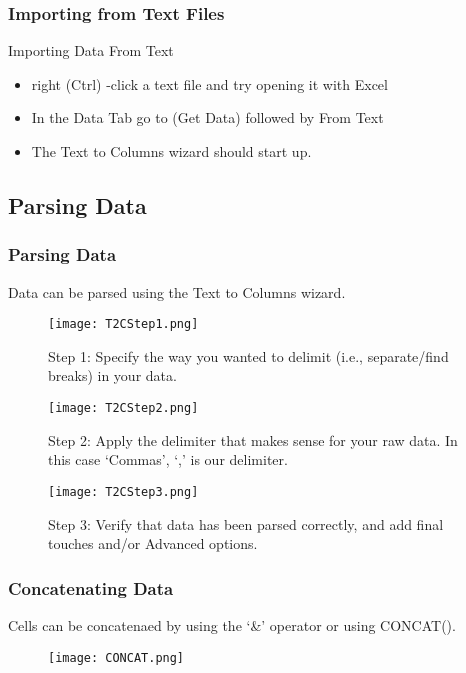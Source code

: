 \documentclass[12pt]{beamer}
\begin{document}
	\begin{frame}
		\frametitle{Importing from Text Files}
				Importing Data From Text
		\begin{itemize}
			\item right (Ctrl) -click a text file and try opening it with Excel
			\item In the Data Tab go to (Get Data) followed by From Text
			\item The Text to Columns wizard should start up. 
		\end{itemize}
	\end{frame}

\subsection{Parsing Data}
	\begin{frame}
		\frametitle{Parsing Data}
		Data can be parsed using the Text to Columns wizard. 
		\begin{figure}[ht]
			\begin{minipage}{0.3\linewidth}
				\texttt{[image: T2CStep1.png]}
				\caption{Step 1: Specify the way you wanted to delimit (i.e., separate/find breaks) in your data.}
				\label{fig:figure1}
			\end{minipage}%
			\hfill%
			\begin{minipage}{0.3\linewidth}
				\texttt{[image: T2CStep2.png]}
				\caption{Step 2: Apply the delimiter that makes sense for your raw data. In this case `Commas', `,' is our delimiter.}
				\label{fig:figure2}
			\end{minipage}%
			\hfill%
			\begin{minipage}{0.3\linewidth}
				\texttt{[image: T2CStep3.png]}
				\caption{Step 3: Verify that data has been parsed correctly, and add final touches and/or Advanced options.}
				\label{fig:figure3}
			\end{minipage}
		\end{figure}
	\end{frame}

	\begin{frame}
		\frametitle{Concatenating Data}
		Cells can be concatenaed by using the `\&' operator or using CONCAT().
			\begin{figure}
				\begin{center}
					\texttt{[image: CONCAT.png]}
				\end{center}
			\end{figure}
	\end{frame}
\end{document}
